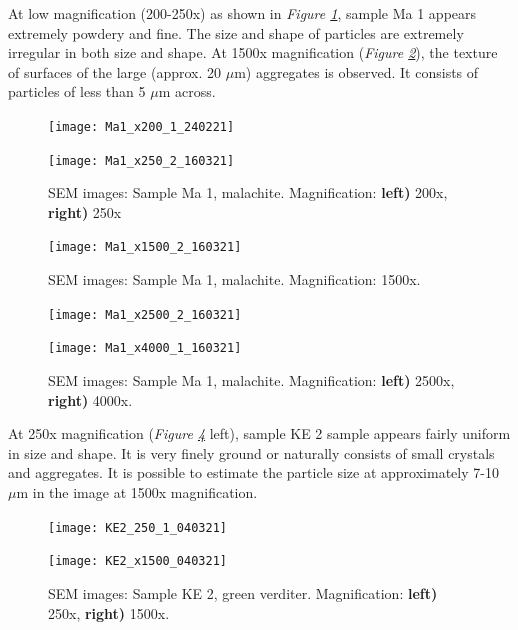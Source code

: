 At low magnification (200-250x) as shown in \textit{Figure \ref{fig:Ma1_sem_3}}, sample Ma 1 appears extremely powdery and fine. The size and shape of particles are extremely irregular in both size and shape. At 1500x magnification (\textit{Figure \ref{fig:Ma1_sem_4}}), the texture of surfaces of the large (approx. 20 $\mu$m) aggregates is observed. It consists of particles of less than 5 $\mu$m across. 

\begin{figure}[H]
\centering
\begin{minipage}{.45\textwidth}
  \centering
  \texttt{[image: Ma1\_x200\_1\_240221]}
\end{minipage}
\begin{minipage}{.45\textwidth}
  \centering
  \texttt{[image: Ma1\_x250\_2\_160321]}
\end{minipage}
\caption[SEM images: Sample Ma 1, malachite]{SEM images: Sample Ma 1, malachite. Magnification: \textbf{left)} 200x, \textbf{right)} 250x}
\label{fig:Ma1_sem_3}
\end{figure}

\begin{figure}[H]
\centering
  \texttt{[image: Ma1\_x1500\_2\_160321]}
\caption[SEM images: Sample Ma 1, malachite]{SEM images: Sample Ma 1, malachite. Magnification: 1500x.}
\label{fig:Ma1_sem_4}
\end{figure}

\begin{figure}[H]
\centering
\begin{minipage}{.45\textwidth}
  \centering
  \texttt{[image: Ma1\_x2500\_2\_160321]}
\end{minipage}
\begin{minipage}{.45\textwidth}
  \centering
  \texttt{[image: Ma1\_x4000\_1\_160321]}
\end{minipage}
\caption[SEM images: Sample Ma 1, malachite]{SEM images: Sample Ma 1, malachite. Magnification: \textbf{left)} 2500x, \textbf{right)} 4000x.}
\label{fig:Ma1_sem_5}
\end{figure}



At 250x magnification (\textit{Figure \ref{fig:KE2_sem_2}} left), sample KE 2 sample appears fairly uniform in size and shape. It is very finely ground or naturally consists of small crystals and aggregates. It is possible to estimate the particle size at approximately 7-10 $\mu$m in the image at 1500x magnification.

\begin{figure}[H]
\centering
\begin{minipage}{.45\textwidth}
  \centering
  \texttt{[image: KE2\_250\_1\_040321]}
\end{minipage}
\begin{minipage}{.45\textwidth}
  \centering
  \texttt{[image: KE2\_x1500\_040321]}
\end{minipage}
\caption[SEM images: Sample KE 2, green verditer]{SEM images: Sample KE 2, green verditer. Magnification: \textbf{left)} 250x, \textbf{right)} 1500x.}
\label{fig:KE2_sem_2}
\end{figure}



